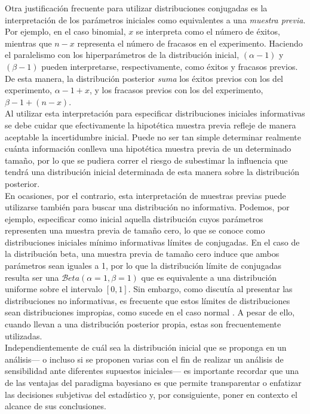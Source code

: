{{Otra justificación frecuente para utilizar distribuciones conjugadas es la interpretación de los parámetros iniciales como equivalentes a una \textit{muestra previa}. Por ejemplo, en el caso binomial, $x$ se interpreta como el número de éxitos, mientras que $n-x$ representa el número de fracasos en el experimento. Haciendo el paralelismo con los hiperparámetros de la distribución inicial, $(\alpha-1)$ y $(\beta-1)$ pueden interpretarse, respectivamente, como éxitos y fracasos previos. De esta manera, la distribución posterior \textit{suma} los éxitos previos con los del experimento, $\alpha -1 + x$, y los fracasos previos con los del experimento, $\beta -1 + (n-x)$.\\ 

Al utilizar esta interpretación para especificar distribuciones iniciales informativas se debe cuidar que efectivamente la hipotética muestra previa refleje de manera aceptable la incertidumbre inicial. Puede no ser tan simple determinar realmente cuánta información conlleva una hipotética muestra previa de un determinado tamaño, por lo que se pudiera correr el riesgo de subestimar la influencia que tendrá una distribución inicial determinada de esta manera sobre la distribución posterior.\\ 

En ocasiones, por el contrario, esta interpretación de muestras previas puede utilizarse también para buscar una distribución no informativa. Podemos, por ejemplo, especificar como inicial aquella distribución cuyos parámetros representen una muestra previa de tamaño cero, lo que se conoce como distribuciones iniciales mínimo informativas límites de conjugadas. En el caso de la distribución beta, una muestra previa de tamaño cero induce que ambos parámetros sean iguales a 1, por lo que la distribución límite de conjugadas resulta ser una $\mathcal{B}eta(\alpha = 1, \beta = 1)$ que es equivalente a una distribución uniforme sobre el intervalo $[0,1]$. Sin embargo, como discutía al presentar las distribuciones no informativas, es frecuente que estos límites de distribuciones sean distribuciones impropias, como sucede en el caso normal \parencite{Mendoza11}. A pesar de ello, cuando llevan a una distribución posterior propia, estas son frecuentemente utilizadas.\\

Independientemente de cuál sea la distribución inicial que se proponga en un análisis--- o incluso si se proponen varias con el fin de realizar un análisis de sensibilidad ante diferentes supuestos iniciales--- es importante recordar que una de las ventajas del paradigma bayesiano es que permite transparentar o enfatizar las decisiones subjetivas del estadístico y, por consiguiente, poner en contexto el alcance de sus conclusiones.\\ 

}}
